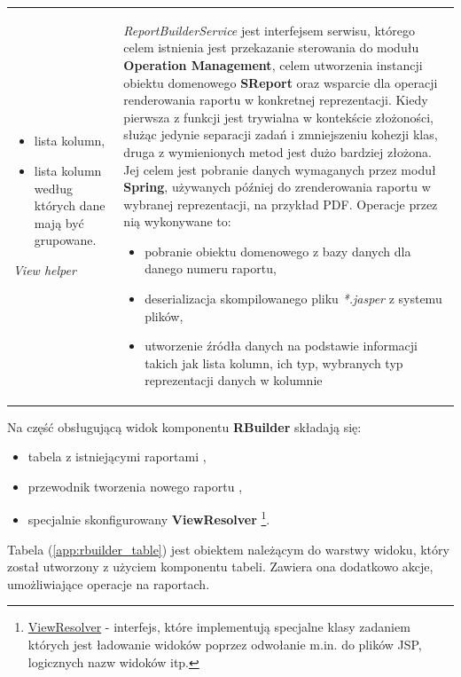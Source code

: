 \begin{center}
\begin{longtable}{| p{2.5cm} | p{13cm} |}
\begin{itemize}
				\item lista kolumn,
				\item lista kolumn według których dane mają być grupowane.
			\end{itemize}
			\hline
			\emph{View helper}												&
			\emph{ReportBuilderService} jest interfejsem serwisu, którego celem istnienia jest przekazanie sterowania do modułu
			\textbf{Operation Management}, celem utworzenia instancji obiektu domenowego \textbf{SReport} oraz wsparcie
			dla operacji renderowania raportu w konkretnej reprezentacji. Kiedy pierwsza z funkcji jest trywialna w kontekście złożoności, służąc
			jedynie separacji zadań i zmniejszeniu kohezji klas, druga z wymienionych metod jest dużo bardziej złożona.
			Jej celem jest pobranie danych wymaganych przez moduł \textbf{Spring}, używanych później do zrenderowania raportu 
			w wybranej reprezentacji, na przykład PDF. Operacje przez nią wykonywane to:
			\begin{itemize}
				\item pobranie obiektu domenowego z bazy danych dla danego numeru raportu, 
				\item deserializacja skompilowanego pliku \textit{*.jasper} z systemu plików,
				\item utworzenie źródła danych na podstawie informacji takich jak lista kolumn, ich typ, wybranych typ reprezentacji danych w kolumnie
			\end{itemize}
			\hline
		\end{longtable}
	\end{center}
				 
	Na część obsługującą widok komponentu \textbf{RBuilder} składają się:
	\begin{itemize}
		\item tabela z istniejącymi raportami \label{app:rbuilder_table},
		\item przewodnik tworzenia nowego raportu \label{app:rbuilder_wizard},
		\item specjalnie skonfigurowany \textbf{ViewResolver} \footnote{\href{http://docs.spring.io/spring/docs/current/javadoc-api/org/springframework/web/servlet/ViewResolver.html}{ViewResolver} - interfejs, które implementują specjalne klasy zadaniem których jest ładowanie widoków poprzez odwołanie m.in. do plików JSP, logicznych nazw widoków itp.}.
	\end{itemize}

	Tabela (\ref{app:rbuilder_table}) jest obiektem należącym do warstwy widoku, który został utworzony z użyciem komponentu
	tabeli. Zawiera ona dodatkowo akcje, umożliwiające operacje na raportach. 
	

